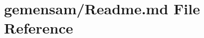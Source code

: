 \hypertarget{gemensam_2_readme_8md}{}\section{gemensam/\+Readme.md File Reference}
\label{gemensam_2_readme_8md}
